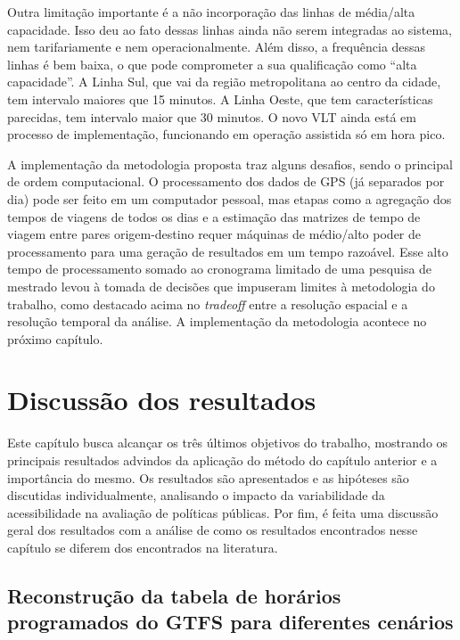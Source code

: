 \documentclass[        
    a4paper,          %
    12pt,             %
    chapter=TITLE,    %
    section=Title,    %
    subsection=Title, %
    oneside,          %
    english,          %
    spanish,          %
    brazil,           %
    fleqn             %
]{abntex2}
\begin{document}
  Outra limitação importante é a não incorporação das linhas de média/alta capacidade. Isso deu ao fato dessas linhas ainda não serem integradas ao sistema, nem tarifariamente e nem operacionalmente. Além disso, a frequência dessas linhas é bem baixa, o que pode comprometer a sua qualificação como ``alta capacidade''. A Linha Sul, que vai da região metropolitana ao centro da cidade, tem intervalo maiores que 15 minutos. A Linha Oeste, que tem características parecidas, tem intervalo maior que 30 minutos. O novo VLT ainda está em processo de implementação, funcionando em operação assistida só em hora pico.
  
  A implementação da metodologia proposta traz alguns desafios, sendo o principal de ordem computacional. O processamento dos dados de GPS (já separados por dia) pode ser feito em um computador pessoal, mas etapas como a agregação dos tempos de viagens de todos os dias e a estimação das matrizes de tempo de viagem entre pares origem-destino requer máquinas de médio/alto poder de processamento para uma geração de resultados em um tempo razoável. Esse alto tempo de processamento somado ao cronograma limitado de uma pesquisa de mestrado levou à tomada de decisões que impuseram limites à metodologia do trabalho, como destacado acima no \emph{tradeoff} entre a resolução espacial e a resolução temporal da análise. A implementação da metodologia acontece no próximo capítulo.
  
  \hypertarget{discussao-dos-resultados}{%
  \chapter{Discussão dos resultados}\label{discussao-dos-resultados}}
  
  Este capítulo busca alcançar os três últimos objetivos do trabalho, mostrando os principais resultados advindos da aplicação do método do capítulo anterior e a importância do mesmo. Os resultados são apresentados e as hipóteses são discutidas individualmente, analisando o impacto da variabilidade da acessibilidade na avaliação de políticas públicas. Por fim, é feita uma discussão geral dos resultados com a análise de como os resultados encontrados nesse capítulo se diferem dos encontrados na literatura.
  
  \hypertarget{reconstrucao-da-tabela-de-horarios-programados-do-gtfs-para-diferentes-cenarios-1}{%
  \section{Reconstrução da tabela de horários programados do GTFS para diferentes cenários}\label{reconstrucao-da-tabela-de-horarios-programados-do-gtfs-para-diferentes-cenarios-1}}
  
\end{document}
